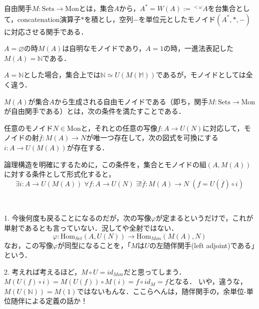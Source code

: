 \documentclass[uplatex, 12pt, dvipdfmx]{jsarticle}
\begin{document}
\begin{definition*}
    自由関手$M:\mathrm{Sets}\to\mathrm{Mon}$とは，集合$A$から，$A^*=W(A):={}^{<\omega}\!A$を台集合として，concatenation演算子$*$を積とし，空列$-$を単位元としたモノイド$(A^*,*,-)$に対応させる関手である．
\end{definition*}
\begin{remark*}
    $A=\varnothing$の時$M(A)$は自明なモノイドであり，$A=1$の時，一進法表記した$M(A)=\mathbb{N}$である．

    $A=\mathbb{N}$とした場合，集合上では$\mathbb{N}\simeq U(M(\mathbb{M}))$であるが，モノイドとしては全く違う．
\end{remark*}

\begin{definition*}
    $M(A)$が集合$A$から生成される自由モノイドである（即ち，関手$M:\mathrm{Sets}\to\mathrm{Mon}$が自由関手である）とは，次の条件を満たすことである．

    任意のモノイド$N\in\mathrm{Mon}$と，それとの任意の写像$f:A\to U(N)$に対応して，モノイドの射$\overline{f}:M(A)\to N$が唯一つ存在して，次の図式を可換にする$i:A\to U(M(A))$が存在する．
    \begin{center}
    \end{center}
    論理構造を明確にするために，この条件を，集合とモノイドの組$(A,M(A))$に対する条件として形式化すると，
    \[ \exists i:A\to U(M(A))\; \forall f:A\to U(N)\; \exists! \overline{f}:M(A)\to N \; (f=U(\overline{f})\circ i) \]
    \rightline{$\blacksquare$}
\end{definition*}
\begin{remark*}　

    1. 今後何度も戻ることになるのだが，次の写像$\varphi$が定まるというだけで，これが単射であるとも言っていない．況してや全射ではない．
    \[ \varphi:\mathrm{Hom}_{Set}(A,U(N))\to\mathrm{Hom}_{Mon}(M(A),N) \]
    なお，この写像$\varphi$が同型になることを，「$M$は$U$の左随伴関手(left adjoint)である」という．

    2. 考えれば考えるほど，$M\circ U=id_{Mon}$だと思ってしまう．$M(U(f)\circ i)=M(U(f))\circ M(i)=f\circ id_M=f$となる．
    いや，違うな，$M(U(\mathbb{N}))=M(1)$ではないもんな．ここらへんは，随伴関手の，余単位-単位随伴による定義の話か！
\end{remark*}
\end{document}
